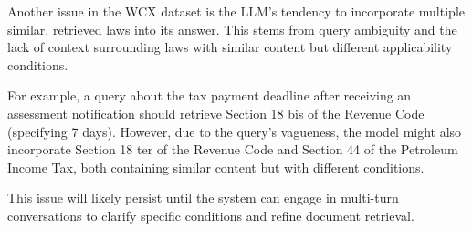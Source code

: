 



Another issue in the WCX dataset is the LLM's tendency to incorporate multiple similar, retrieved laws into its answer. This stems from query ambiguity and the lack of context surrounding laws with similar content but different applicability conditions.

For example, a query about the tax payment deadline after receiving an assessment notification should retrieve Section 18 bis of the Revenue Code (specifying 7 days). However, due to the query's vagueness, the model might also incorporate Section 18 ter of the Revenue Code and Section 44 of the Petroleum Income Tax, both containing similar content but with different conditions.

This issue will likely persist until the system can engage in multi-turn conversations to clarify specific conditions and refine document retrieval.


